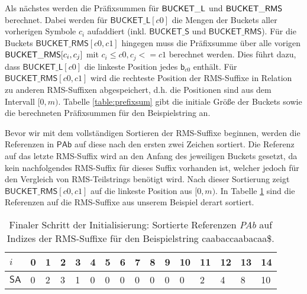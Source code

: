 Als nächstes werden die Präfixsummen für $\mathsf{BUCK\-ET\_L}$ und $\mathsf{BUCK\-ET\_RMS}$ berechnet. Dabei werden für $\mathsf{BUCKET\_L}[c0]$ die Mengen der Buckets aller vorherigen Symbole $c_i$ aufaddiert (inkl. $\mathsf{BUCKET\_S}$ und $\mathsf{BUCKET\_RMS}$). Für die Buckets $\mathsf{BUCKET\_RMS}[c0,c1]$ hingegen muss die Präfixsumme über alle vorigen $\mathsf{BUCK\-ET\_RMS}[c_i,c_j]$  mit $c_i \leq c0, c_j <= c1$ berechnet werden. Dies führt dazu, dass $\mathsf{BUCKET\_L}[c0]$ die linkeste Position jedes $\mathsf{b}_{c0}$ enthält. Für $\mathsf{BUCKET\_RMS}[c0,c1]$ wird die rechteste Position der RMS-Suffixe in Relation zu anderen RMS-Suffixen abgespeichert, d.h. die Positionen sind aus dem Intervall $[0,m)$. Tabelle \ref{table:prefixsum} gibt die initiale Größe der Buckets sowie die berechneten Präfixsummen für den Beispielstring an.

Bevor wir mit dem vollständigen Sortieren der RMS-Suffixe beginnen, werden die Referenzen in $\mathsf{PAb}$ auf diese nach den ersten zwei Zeichen sortiert. Die Referenz auf das letzte RMS-Suffix wird an den Anfang des jeweiligen Buckets gesetzt, da kein nachfolgendes RMS-Suffix für dieses Suffix vorhanden ist, welcher jedoch für den Vergleich von RMS-Teilstrings benötigt wird. Nach dieser Sortierung zeigt $\mathsf{BUCKET\_RMS}[c0,c1]$ auf die linkeste Position aus $[0,m)$. In Tabelle \ref{table:bucket-order} sind die Referenzen auf die RMS-Suffixe aus unserem Beispiel derart sortiert.

\begin{table}
	\centering
	\begin{tabular}[t]{l|lllllllllllllll}
		$i$  & 0                         & 1                         & 2                         & 3                         & 4 & 5 & 6 & 7 & 8 & 9 & 10 & 11 & 12 & 13 & 14 \\ \hline
		$\mathsf{SA}$ & \cellcolor[HTML]{32CB00}0 & \cellcolor[HTML]{32CB00}2 & \cellcolor[HTML]{32CB00}3 & \cellcolor[HTML]{32CB00}1 & 0 & 0 & 0 & 0 & 0 & 0 & 0  & 2  & 4  & 8  & 10 \\ \hline
	\end{tabular}	\newline

	\caption{Finaler Schritt der Initialisierung: Sortierte Referenzen \textit{PAb} auf Indizes der RMS-Suffixe für den Beispielstring caabaccaabacaa\$.}
	\label{table:bucket-order}
\end{table}

